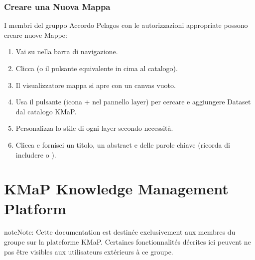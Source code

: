 \documentclass[letterpaper,10pt,english]{sphinxmanual}
\begin{document}
\subsection{Creare una Nuova Mappa}
\label{\detokenize{it/04_esplorare_mappe:creare-una-nuova-mappa}}
\sphinxAtStartPar
I membri del gruppo Accordo Pelagos con le autorizzazioni appropriate possono creare
nuove Mappe:
\begin{enumerate}
%
\item {} 
\sphinxAtStartPar
Vai su  nella barra di navigazione.

\item {} 
\sphinxAtStartPar
Clicca  (o il pulsante equivalente in cima al catalogo).

\item {} 
\sphinxAtStartPar
Il visualizzatore mappa si apre con un canvas vuoto.

\item {} 
\sphinxAtStartPar
Usa il pulsante  (icona + nel pannello layer) per cercare e aggiungere
Dataset dal catalogo KMaP.

\item {} 
\sphinxAtStartPar
Personalizza lo stile di ogni layer secondo necessità.

\item {} 
\sphinxAtStartPar
Clicca  e fornisci un titolo, un abstract e delle parole chiave
(ricorda di includere  o ).

\end{enumerate}

\sphinxstepscope


\chapter{KMaP \textendash{} Knowledge Management Platform}
\label{\detokenize{fr/index:kmap-knowledge-management-platform}}\label{\detokenize{fr/index::doc}}
\sphinxAtStartPar
{}

\begin{sphinxadmonition}{note}{Note:}
\sphinxAtStartPar
Cette documentation est destinée exclusivement aux membres du groupe
 sur la plateforme KMaP. Certaines fonctionnalités décrites ici
peuvent ne pas être visibles aux utilisateurs extérieurs à ce groupe.
\end{sphinxadmonition}
\end{document}
